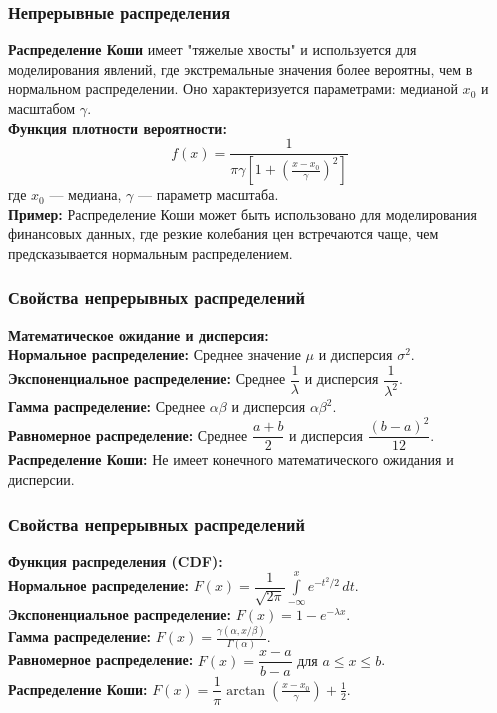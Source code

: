 \documentclass[aspectratio=169]{beamer}
\begin{document}
\begin{frame}
\frametitle{Непрерывные распределения}
{\bf Распределение Коши} имеет "тяжелые хвосты" и используется для моделирования явлений, где экстремальные значения более вероятны, чем в нормальном распределении. Оно характеризуется параметрами: медианой \( x_0 \) и масштабом \( \gamma \).\\
{\bf Функция плотности вероятности:}
  \[
  f(x) = \frac{1}{\pi \gamma \left[ 1 + \left( \frac{x - x_0}{\gamma} \right)^2 \right]}
  \]
где \( x_0 \) — медиана, \( \gamma \) — параметр масштаба.\\
{\bf Пример:} Распределение Коши может быть использовано для моделирования финансовых данных, где резкие колебания цен встречаются чаще, чем предсказывается нормальным распределением.
\end{frame}

\begin{frame}
\frametitle{Свойства непрерывных распределений}
{\bf Математическое ожидание и дисперсия:}
\newline\\
{\bf Нормальное распределение:} Среднее значение \( \mu \) и дисперсия \( \sigma^2 \).
\newline\\
{\bf Экспоненциальное распределение:} Среднее \( \dfrac{1}{\lambda} \) и дисперсия \( \dfrac{1}{\lambda^2} \).
\newline\\
{\bf Гамма распределение:} Среднее \( \alpha \beta \) и дисперсия \( \alpha \beta^2 \).
\newline\\
{\bf Равномерное распределение:} Среднее \( \dfrac{a + b}{2} \) и дисперсия \( \dfrac{(b - a)^2}{12} \).
\newline\\
{\bf Распределение Коши:} Не имеет конечного математического ожидания и дисперсии.
\end{frame}

\begin{frame}
\frametitle{Свойства непрерывных распределений}
{\bf Функция распределения (CDF):}
\newline\\
{\bf Нормальное распределение:} $F(x)={\dfrac {1}{\sqrt {2\pi }}}\int \limits _{-\infty }^{x}e^{-t^{2}/2}\,dt$.
\newline\\
{\bf Экспоненциальное распределение:} $F(x) = 1 - e^{-\lambda x}$.
\newline\\
{\bf Гамма распределение:} $F(x) = \frac{\gamma(\alpha, x / \beta)}{\Gamma(\alpha)}$.
\newline\\
{\bf Равномерное распределение:} $F(x) = \dfrac{x - a}{b - a} \text{ для } a \leq x \leq b$.
\newline\\
{\bf Распределение Коши:} $F(x) = \dfrac{1}{\pi} \arctan\left(\frac{x - x_0}{\gamma}\right) + \frac{1}{2}$.
\end{frame}
\end{document}
